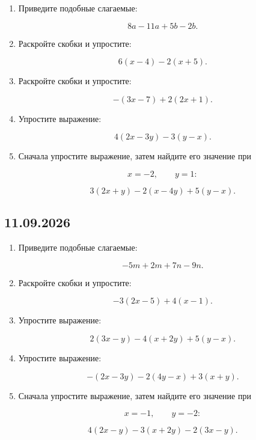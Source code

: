 \documentclass[a4paper,12pt]{article}
\begin{document}
\begin{enumerate}[label=\textbf{\arabic*.}]

  \item Приведите подобные слагаемые:

  \[
  8a-11a+5b-2b.
  \]

  \item Раскройте скобки и упростите:

  \[
  6(x-4)-2(x+5).
  \]

  \item Раскройте скобки и упростите:

  \[
  -(3x-7)+2(2x+1).
  \]

  \item Упростите выражение:

  \[
  4(2x-3y)-3(y-x).
  \]

  \item Сначала упростите выражение,
  затем найдите его значение при

  \[
  x=-2,
  \qquad
  y=1:
  \]

  \[
  3(2x+y)-2(x-4y)+5(y-x).
  \]

\end{enumerate}


\subsection*{11.09.2026}

\begin{enumerate}[label=\textbf{\arabic*.},resume]

  \item Приведите подобные слагаемые:

  \[
  -5m+2m+7n-9n.
  \]

  \item Раскройте скобки и упростите:

  \[
  -3(2x-5)+4(x-1).
  \]

  \item Упростите выражение:

  \[
  2(3x-y)-4(x+2y)+5(y-x).
  \]

  \item Упростите выражение:

  \[
  -(2x-3y)-2(4y-x)+3(x+y).
  \]

  \item Сначала упростите выражение,
  затем найдите его значение при

  \[
  x=-1,
  \qquad
  y=-2:
  \]

  \[
  4(2x-y)-3(x+2y)-2(3x-y).
  \]

\end{enumerate}
\end{document}

